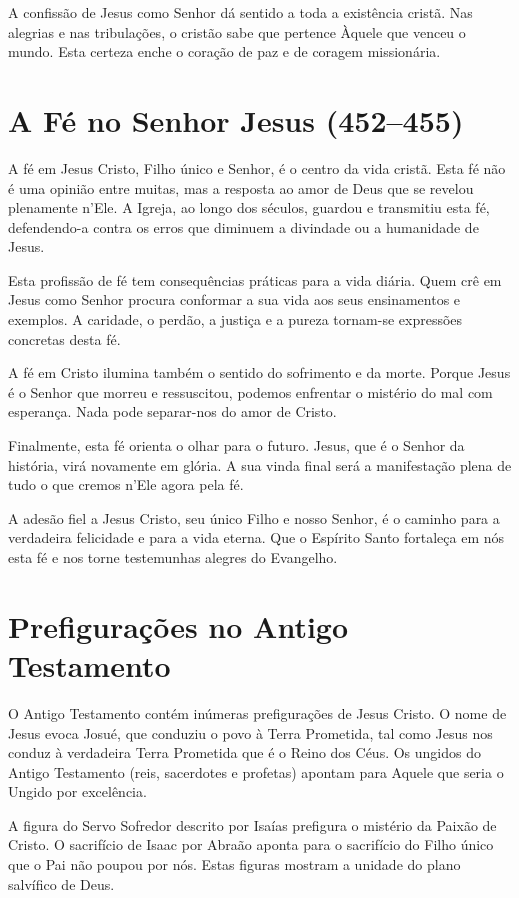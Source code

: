A confissão de Jesus como Senhor dá sentido a toda a existência cristã. Nas alegrias e nas tribulações, o cristão sabe que pertence Àquele que venceu o mundo. Esta certeza enche o coração de paz e de coragem missionária.

\section{A Fé no Senhor Jesus (452--455)}

A fé em Jesus Cristo, Filho único e Senhor, é o centro da vida cristã. Esta fé não é uma opinião entre muitas, mas a resposta ao amor de Deus que se revelou plenamente n’Ele. A Igreja, ao longo dos séculos, guardou e transmitiu esta fé, defendendo-a contra os erros que diminuem a divindade ou a humanidade de Jesus.

Esta profissão de fé tem consequências práticas para a vida diária. Quem crê em Jesus como Senhor procura conformar a sua vida aos seus ensinamentos e exemplos. A caridade, o perdão, a justiça e a pureza tornam-se expressões concretas desta fé.

A fé em Cristo ilumina também o sentido do sofrimento e da morte. Porque Jesus é o Senhor que morreu e ressuscitou, podemos enfrentar o mistério do mal com esperança. Nada pode separar-nos do amor de Cristo.

Finalmente, esta fé orienta o olhar para o futuro. Jesus, que é o Senhor da história, virá novamente em glória. A sua vinda final será a manifestação plena de tudo o que cremos n’Ele agora pela fé.

A adesão fiel a Jesus Cristo, seu único Filho e nosso Senhor, é o caminho para a verdadeira felicidade e para a vida eterna. Que o Espírito Santo fortaleça em nós esta fé e nos torne testemunhas alegres do Evangelho.

\section{Prefigurações no Antigo Testamento}

O Antigo Testamento contém inúmeras prefigurações de Jesus Cristo. O nome de Jesus evoca Josué, que conduziu o povo à Terra Prometida, tal como Jesus nos conduz à verdadeira Terra Prometida que é o Reino dos Céus. Os ungidos do Antigo Testamento (reis, sacerdotes e profetas) apontam para Aquele que seria o Ungido por excelência.

A figura do Servo Sofredor descrito por Isaías prefigura o mistério da Paixão de Cristo. O sacrifício de Isaac por Abraão aponta para o sacrifício do Filho único que o Pai não poupou por nós. Estas figuras mostram a unidade do plano salvífico de Deus.

